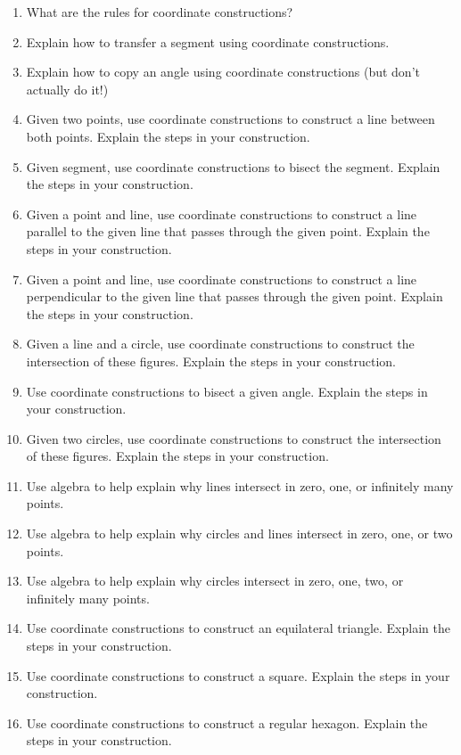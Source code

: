 \begin{problems}
\begin{enumerate}
\item What are the rules for coordinate constructions?
\item Explain how to transfer a segment using coordinate
  constructions. 
\item Explain how to copy an angle using coordinate constructions (but don't actually do it!)
\item Given two points, use coordinate constructions to construct a
  line between both points. Explain the steps in your construction.
\item Given segment, use coordinate constructions to bisect the
  segment. Explain the steps in your construction.
\item Given a point and line, use coordinate constructions to
  construct a line parallel to the given line that passes through the
  given point. Explain the steps in your construction.
\item Given a point and line, use coordinate constructions to
  construct a line perpendicular to the given line that passes through
  the given point. Explain the steps in your construction.
\item Given a line and a circle, use coordinate constructions to
  construct the intersection of these figures. Explain the steps in
  your construction.
\item Use coordinate constructions to bisect a given angle. Explain
  the steps in your construction.
\item Given two circles, use coordinate constructions to
  construct the intersection of these figures. Explain the steps in
  your construction.
\item Use algebra to help explain why lines intersect in zero, one, or
  infinitely many points.
\item Use algebra to help explain why circles and lines intersect in
  zero, one, or two points.
\item Use algebra to help explain why circles intersect in zero, one,
  two, or infinitely many points.
\item Use coordinate constructions to construct an equilateral
  triangle. Explain the steps in your construction.
\item Use coordinate constructions to construct a square. Explain the
  steps in your construction.
\item Use coordinate constructions to construct a regular
  hexagon. Explain the steps in your construction.
\end{enumerate}
\end{problems}

